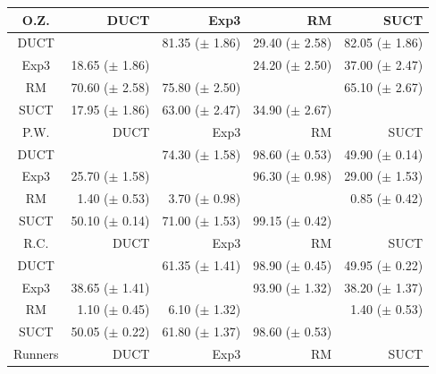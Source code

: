 \documentclass[conference]{IEEEtran}
\begin{document}
\begin{table}
\begin{center}
{\begin{tabular}{|c|rrrr|}
\hline
\hline
       O.Z.   &       DUCT   &       Exp3   &         RM   &       SUCT   \\
\hline
           DUCT    &              & 81.35 ($\pm$ 1.86)   & 29.40 ($\pm$ 2.58)   & 82.05 ($\pm$ 1.86)   \\
           Exp3    & 18.65 ($\pm$ 1.86)   &              & 24.20 ($\pm$ 2.50)   & 37.00 ($\pm$ 2.47)   \\
             RM    & 70.60 ($\pm$ 2.58)   & 75.80 ($\pm$ 2.50)   &              & 65.10 ($\pm$ 2.67)   \\
           SUCT    & 17.95 ($\pm$ 1.86)   & 63.00 ($\pm$ 2.47)   & 34.90 ($\pm$ 2.67)   &              \\
\hline
\hline
   P.W.   &       DUCT   &       Exp3   &         RM   &       SUCT   \\
\hline
           DUCT    &              & 74.30 ($\pm$ 1.58)   & 98.60 ($\pm$ 0.53)   & 49.90 ($\pm$ 0.14)   \\
           Exp3    & 25.70 ($\pm$ 1.58)   &              & 96.30 ($\pm$ 0.98)   & 29.00 ($\pm$ 1.53)   \\
             RM    & 1.40 ($\pm$ 0.53)   & 3.70 ($\pm$ 0.98)   &              & 0.85 ($\pm$ 0.42)   \\
           SUCT    & 50.10 ($\pm$ 0.14)   & 71.00 ($\pm$ 1.53)   & 99.15 ($\pm$ 0.42)   &              \\
\hline
\hline
R.C.   &       DUCT   &       Exp3   &         RM   &       SUCT   \\
\hline
           DUCT    &              & 61.35 ($\pm$ 1.41)   & 98.90 ($\pm$ 0.45)   & 49.95 ($\pm$ 0.22)   \\
           Exp3    & 38.65 ($\pm$ 1.41)   &              & 93.90 ($\pm$ 1.32)   & 38.20 ($\pm$ 1.37)   \\
             RM    & 1.10 ($\pm$ 0.45)   & 6.10 ($\pm$ 1.32)   &              & 1.40 ($\pm$ 0.53)   \\
           SUCT    & 50.05 ($\pm$ 0.22)   & 61.80 ($\pm$ 1.37)   & 98.60 ($\pm$ 0.53)   &              \\
\hline
\hline
        Runners   &       DUCT   &       Exp3   &         RM   &       SUCT   \\
\hline


\end{tabular}}
\end{center}
\end{table}
\end{document}
